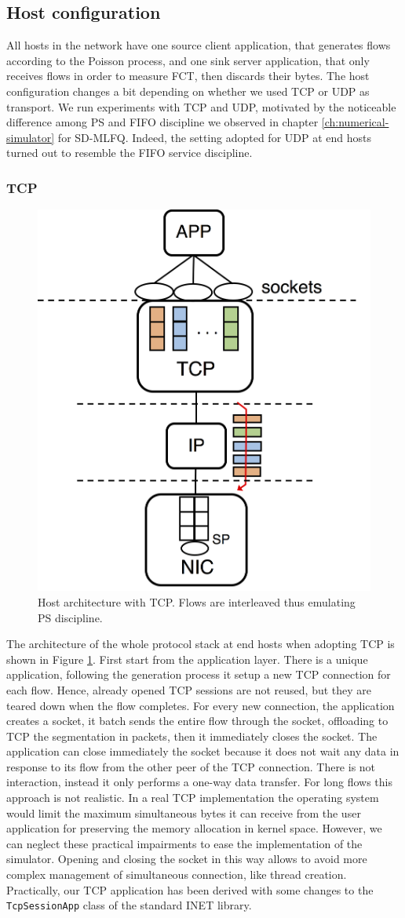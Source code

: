 \subsection{Host configuration}
\label{sec:host-config}
All hosts in the network have one source client application, that generates flows according to the Poisson process, and one sink server application, that only receives flows in order to measure FCT, then discards their bytes. The host configuration changes a bit depending on whether we used TCP or UDP as transport. We run experiments with TCP and UDP, motivated by the noticeable difference among PS and FIFO discipline we observed in chapter \ref{ch:numerical-simulator} for SD-MLFQ. Indeed, the setting adopted for UDP at end hosts turned out to resemble the FIFO service discipline. 
\subsubsection{TCP}
\begin{figure}[!tb]
	\centering
	\captionsetup{width=.75\linewidth}
	\includegraphics[width=0.4\linewidth]{Chapter4/Figures/tcp-config}
	\caption{Host architecture with TCP. Flows are interleaved thus emulating PS discipline.}
	\label{fig:tcp-config}
\end{figure}%
The architecture of the whole protocol stack at end hosts when adopting TCP is shown in Figure \ref{fig:tcp-config}. First start from the application layer. There is a unique application, following the generation process it setup a new TCP connection for each flow. Hence, already opened TCP sessions are not reused, but they are teared down when the flow completes. For every new connection, the application creates a socket, it batch sends the entire flow through the socket, offloading to TCP the segmentation in packets, then it immediately closes the socket. The application can close immediately the socket because it does not wait any data in response to its flow from the other peer of the TCP connection. There is not interaction, instead it only performs a one-way data transfer. For long flows this approach is not realistic. In a real TCP implementation the operating system would limit the maximum simultaneous bytes it can receive from the user application for preserving the memory allocation in kernel space. However, we can neglect these practical impairments to ease the implementation of the simulator. Opening and closing the socket in this way allows to avoid more complex management of simultaneous connection, like thread creation. Practically, our TCP application has been derived with some changes to the \texttt{TcpSessionApp} class of the standard INET library.\\
